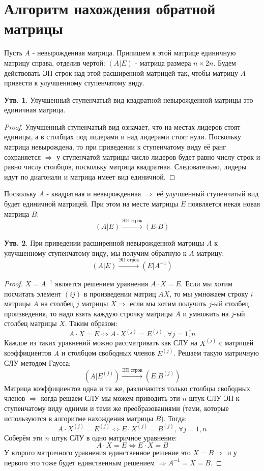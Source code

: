 \documentclass[12pt]{article}
\theoremstyle{definition}
\newtheorem{prop}{Утв.}
\begin{document}
\section*{Алгоритм нахождения обратной матрицы}
Пусть $A$ - невырожденная матрица. Припишем к этой матрице единичную матрицу справа, отделив чертой: $(A|E)$ - матрица размера $n \times 2n$. Будем действовать ЭП строк над этой расширенной матрицей так, чтобы матрицу $A$ привести к улучшенному ступенчатому виду. 
\begin{prop}
	Улучшенный ступенчатый вид квадратной невырожденной матрицы это единичная матрица.
\end{prop}
\begin{proof}
	Улучшенный ступенчатый вид означает, что на местах лидеров стоят единицы, а в столбцах под лидерами и над лидерами стоят нули. Поскольку матрица невырождена, то при приведении к ступенчатому виду её ранг сохраняется $\Rightarrow$ у ступенчатой матрицы число лидеров будет равно числу строк и равно числу столбцов, поскольку матрица квадратная. Следовательно, лидеры идут по диагонали и матрица имеет вид единичной.
\end{proof}
Поскольку $A$ - квадратная и невырожденная $\Rightarrow$ её улучшенный ступенчатый вид будет единичной матрицей. При этом на месте матрицы $E$ появляется некая новая матрица $B$:
$$
	(A|E) \xrightarrow{\text{ЭП строк}} (E|B)
$$
\begin{prop}
	При приведении расширенной невырожденной матрицы $A$ к улучшенному ступенчатому виду, мы получим обратную к $A$ матрицу:
	$$
		(A|E) \xrightarrow{\text{ЭП строк}} \left(E|A^{-1}\right)
	$$
\end{prop}
\begin{proof}
	$X = A^{-1}$ является решением уравнения $A{\cdot}X = E$. Если мы хотим посчитать элемент $(ij)$ в произведении матриц $AX$, то мы умножаем строку $i$ матрицы $A$ на столбец $j$ матрицы $X \Rightarrow$ если мы хотим получить $j$-ый столбец произведения, то надо взять каждую строчку матрицы $A$ и умножить на $j$-ый столбец матрицы $X$. Таким образом:
	$$
		A{\cdot}X = E \Leftrightarrow A{\cdot}X^{(j)} = E^{(j)}, \, \forall j = \overline{1,n}
	$$
	Каждое из таких уравнений можно рассматривать как СЛУ на $X^{(j)}$ с матрицей коэффициентов $A$ и столбцом свободных членов $E^{(j)}$. Решаем такую матричную СЛУ методом Гаусса: 
	$$
		\left(A|E^{(j)}\right) \xrightarrow{\text{ЭП строк}} \left(E|B^{(j)}\right)
	$$
	Матрица коэффициентов одна и та же, различаются только столбцы свободных членов $\Rightarrow$ когда решаем СЛУ мы можем приводить эти $n$ штук СЛУ ЭП к ступенчатому виду одними и теми же преобразованиями (теми, которые используются в алгоритме нахождения матрицы $B$). Тогда:
	$$
		A{\cdot}X^{(j)} = E^{(j)} \Leftrightarrow E{\cdot}X^{(j)} = B^{(j)}, \, \forall j = \overline{1,n}
	$$
	Соберём эти $n$ штук СЛУ в одно матричное уравнение:
	$$
		A{\cdot}X = E \Leftrightarrow E{\cdot}X = B
	$$
	У второго матричного уравнения единственное решение это $X = B \Rightarrow$ и у первого это тоже будет единственным решением $\Rightarrow A^{-1} = X = B$.
\end{proof}
\end{document}
